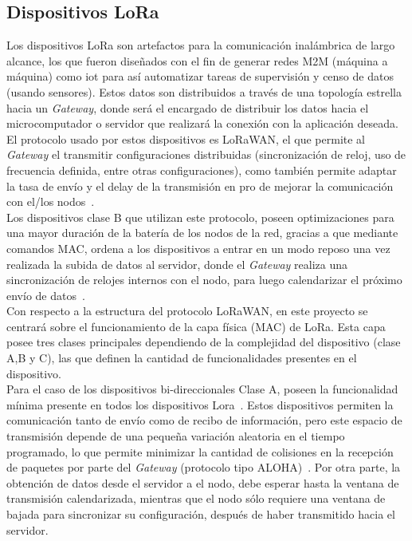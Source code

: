 \begin{justify}
\section{Dispositivos LoRa}
Los dispositivos LoRa son artefactos para la comunicación inalámbrica de largo alcance, los que fueron diseñados con el fin de generar redes M2M (máquina a máquina) como \gls{iot} para así automatizar tareas de supervisión y censo de datos (usando sensores). Estos datos son distribuidos a través de una topología estrella hacia un \textit{Gateway}, donde será el encargado de distribuir los datos hacia el microcomputador o servidor que realizará la conexión con la aplicación deseada.\\
El protocolo usado por estos dispositivos es LoRaWAN, el que permite al \textit{Gateway} el transmitir configuraciones distribuidas (sincronización de reloj, uso de frecuencia definida, entre otras configuraciones), como también permite adaptar la tasa de envío y el delay de  la transmisión en pro de mejorar la comunicación con el/los nodos~\cite{Sornin}.\\
Los dispositivos clase B que utilizan este protocolo, poseen optimizaciones para una mayor duración de la batería de los nodos de la red, gracias a que mediante comandos MAC, ordena a los dispositivos a entrar en un modo reposo una vez realizada la subida de datos al servidor, donde el \textit{Gateway} realiza una sincronización de relojes internos con el nodo, para luego calendarizar el próximo envío de datos~\cite{Sornin}.\\
Con respecto a la estructura del protocolo LoRaWAN, en este proyecto se centrará sobre el funcionamiento de la capa física (MAC) de LoRa. Esta capa posee tres clases principales dependiendo de la complejidad del dispositivo (clase A,B y C), las que definen la cantidad de funcionalidades presentes en el dispositivo.\\
Para el caso de los dispositivos bi-direccionales Clase A, poseen la funcionalidad mínima presente en todos los dispositivos Lora~\cite{Sornin2}. Estos dispositivos permiten la comunicación tanto de envío como de recibo de información, pero este espacio de transmisión depende de una pequeña variación aleatoria en el tiempo programado, lo que permite minimizar la cantidad de colisiones en la recepción de paquetes por parte del \textit{Gateway} (protocolo tipo ALOHA)~\cite{Sornin}. Por otra parte, la obtención de datos desde el servidor a el nodo, debe esperar hasta la ventana de transmisión calendarizada, mientras que el nodo sólo requiere una ventana de bajada para sincronizar su configuración, después de haber transmitido hacia el servidor.\\

\end{justify}
